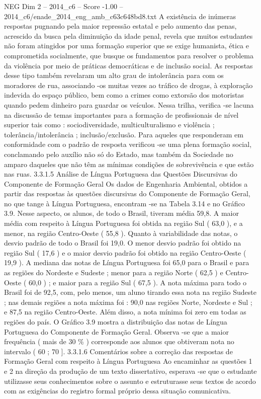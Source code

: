 \begin{textsample}{NEG Dim 2 – 2014\_c6 – Score -1.00 – 2014\_c6/enade\_2014\_eng\_amb\_c63c648bd8.txt}
A existência de inúmeras respostas pugnando pela maior repressão estatal e pelo aumento das penas, acrescido da busca pela diminuição da idade penal, revela que muitos estudantes não foram atingidos por uma formação superior que se exige humanista, ética e comprometida socialmente, que busque os fundamentos para resolver o problema da violência por meio de práticas democráticas e de inclusão social.
As respostas desse tipo também revelaram um alto grau de intolerância para com os moradores de rua, associando -os muitas vezes ao tráfico de drogas, à exploração indevida do espaço público, bem como a crimes como extorsão dos motoristas quando pedem dinheiro para guardar os veículos.
Nessa trilha, verifica -se lacuna na discussão de temas importantes para a formação de profissionais de nível superior tais como : sociodiversidade, multiculturalismo e violência ; tolerância/intolerância ; inclusão/exclusão.
Para aqueles que responderam em conformidade com o padrão de resposta verificou -se uma plena formação social, conclamando pelo auxílio não só do Estado, mas também da Sociedade no amparo daqueles que não têm as mínimas condições de sobrevivência e que estão nas ruas. 3.3.1.5 Análise de Língua Portuguesa das Questões Discursivas do Componente de Formação Geral Os dados de Engenharia Ambiental, obtidos a partir das respostas às questões discursivas do Componente de Formação Geral, no que tange à Língua Portuguesa, encontram -se na Tabela 3.14 e no Gráfico 3.9.
Nesse aspecto, os alunos, de todo o Brasil, tiveram média 59,8.
A maior média com respeito à Língua Portuguesa foi obtida na região Sul ( 63,0 ), e a menor, na região Centro-Oeste ( 55,8 ).
Quanto à variabilidade das notas, o desvio padrão de todo o Brasil foi 19,0.
O menor desvio padrão foi obtido na região Sul ( 17,6 ) e o maior desvio padrão foi obtido na região Centro-Oeste ( 19,9 ).
A mediana das notas de Língua Portuguesa foi 65,0 para o Brasil e para as regiões do Nordeste e Sudeste ; menor para a região Norte ( 62,5 ) e Centro-Oeste ( 60,0 ) ; e maior para a região Sul ( 67,5 ).
A nota máxima para todo o Brasil foi de 92,5, com, pelo menos, um aluno tirando essa nota na região Sudeste ; nas demais regiões a nota máxima foi : 90,0 nas regiões Norte, Nordeste e Sul ; e 87,5 na região Centro-Oeste.
Além disso, a nota mínima foi zero em todas as regiões do país.
O Gráfico 3.9 mostra a distribuição das notas de Língua Portuguesa do Componente de Formação Geral.
Observa -se que a maior frequência ( mais de 30 \% ) corresponde aos alunos que obtiveram nota no intervalo ( 60 ; 70 ]. 3.3.1.6 Comentários sobre a correção das respostas de Formação Geral com respeito à Língua Portuguesa Ao encaminhar as questões 1 e 2 na direção da produção de um texto dissertativo, esperava -se que o estudante utilizasse seus conhecimentos sobre o assunto e estruturasse seus textos de acordo com as exigências do registro formal próprio dessa situação comunicativa.

\end{textsample}
